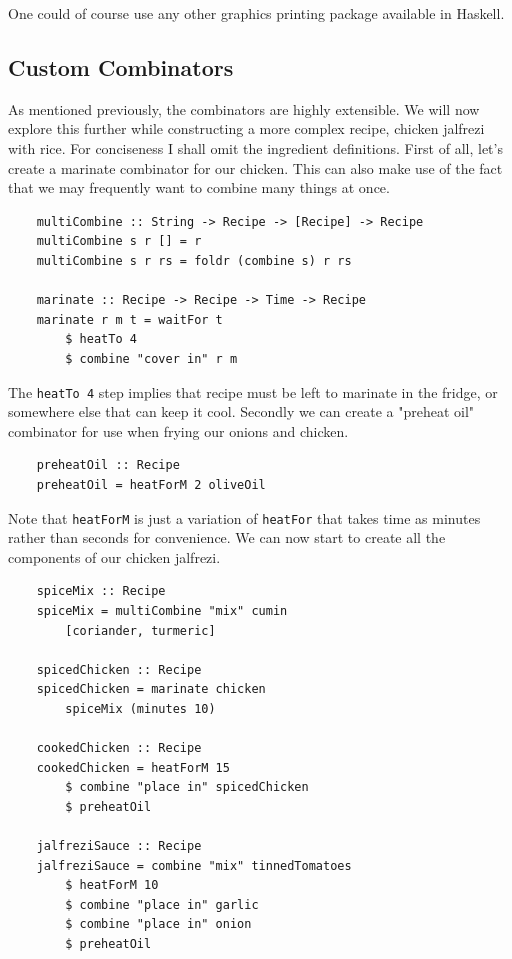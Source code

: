 \documentclass[11pt]{article}
\begin{document}
One could of course use any other graphics printing package available in Haskell.

\subsection{Custom Combinators}

As mentioned previously, the combinators are highly extensible. We will now explore this
further while constructing a more complex recipe, chicken jalfrezi with rice.
For conciseness I shall omit the ingredient definitions. First of all, let's
create a marinate combinator for our chicken. This can also make use of the
fact that we may frequently want to combine many things at once.

\begin{lstlisting}
    multiCombine :: String -> Recipe -> [Recipe] -> Recipe
    multiCombine s r [] = r
    multiCombine s r rs = foldr (combine s) r rs

    marinate :: Recipe -> Recipe -> Time -> Recipe
    marinate r m t = waitFor t
        $ heatTo 4
        $ combine "cover in" r m
\end{lstlisting}

The \texttt{heatTo 4} step implies that recipe must be left to marinate in the fridge,
or somewhere else that can keep it cool. Secondly we can create a "preheat oil" combinator
for use when frying our onions and chicken.

\begin{lstlisting}
    preheatOil :: Recipe
    preheatOil = heatForM 2 oliveOil
\end{lstlisting}

Note that \texttt{heatForM} is just a variation of \texttt{heatFor} that takes time as
minutes rather than seconds for convenience. We can now start to create all the
components of our chicken jalfrezi.

\begin{lstlisting}
    spiceMix :: Recipe
    spiceMix = multiCombine "mix" cumin
        [coriander, turmeric]

    spicedChicken :: Recipe
    spicedChicken = marinate chicken
        spiceMix (minutes 10)

    cookedChicken :: Recipe
    cookedChicken = heatForM 15
        $ combine "place in" spicedChicken
        $ preheatOil

    jalfreziSauce :: Recipe
    jalfreziSauce = combine "mix" tinnedTomatoes
        $ heatForM 10
        $ combine "place in" garlic
        $ combine "place in" onion
        $ preheatOil
\end{lstlisting}
\end{document}

